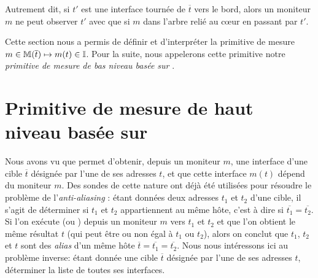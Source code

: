 % 

Autrement dit, si $t'$ est une interface tournée de $\overline{t}$ vers le bord,
alors un moniteur $m$ ne peut observer $t'$ avec \udpping que si $m$ dans
l'arbre relié au c\oe{}ur en passant par $t'$.

Cette section nous a permis de définir et d'interpréter la primitive de mesure
$m \in {\mathbb M}(\overline{t}) \mapsto m(t) \in \mathbb{I}$. Pour la suite, nous
appelerons cette primitive notre {\em primitive de mesure de bas niveau basée
sur \udpping}.

\section{Primitive de mesure de haut niveau basée sur \udpping} 
\label{sec:udpping-one-to-many}

Nous avons vu que \udpping permet d'obtenir, depuis un moniteur $m$, une
interface d'une cible $\overline{t}$ désignée par l'une de ses adresses \ip $t$,
et que cette interface $m(t)$ dépend du moniteur $m$. Des sondes \udp de cette
nature ont déjà été utilisées pour résoudre le problème de l'{\em anti-aliasing}
: étant données deux adresses $t_1$ et $t_2$ d'une cible, il s'agit de
déterminer si $t_1$ et $t_2$ appartiennent au même hôte, c'est à dire si
$\overline{t_1} = \overline{t_2}$. Si l'on exécute \udpping (ou \iffinder)
depuis un moniteur $m$ vers $t_1$ et $t_2$ et que l'on obtient le même résultat
$t$ (qui peut être ou non égal à $t_1$ ou $t_2$), alors on conclut que $t_1$,
$t_2$ et $t$ sont des {\em alias} d'un même hôte $\overline{t} = \overline{t_1}
= \overline{t_2}$.
Nous nous intéressons ici au problème inverse: étant donnée une cible
$\overline{t}$ désignée par l'une de ses adresses \ip $t$, déterminer la liste
de toutes ses interfaces.

